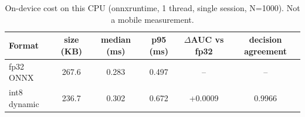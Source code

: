 \begin{table}[t]
\caption{On-device cost on this CPU (onnxruntime, 1 thread, single session, N=1000). Not a mobile measurement.}
\label{tab:ondevice}
\centering
\small
\begin{tabular}{lccccc}
\toprule
Format & size (KB) & median (ms) & p95 (ms) & $\Delta$AUC vs fp32 & decision agreement \\
\midrule
fp32 ONNX & 267.6 & 0.283 & 0.497 & -- & -- \\
int8 dynamic & 236.7 & 0.302 & 0.672 & +0.0009 & 0.9966 \\
\bottomrule
\end{tabular}
\end{table}
